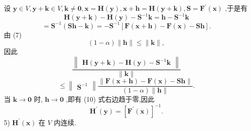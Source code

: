 设 \(\mathbf{y} \in  V,\mathbf{y} + \mathbf{k} \in  V,\mathbf{k} \neq  \mathbf{0},\mathbf{x} = \mathbf{H}\left( \mathbf{y}\right) ,\mathbf{x} + \mathbf{h} = \mathbf{H}\left( {\mathbf{y} + \mathbf{k}}\right) ,\mathbf{S} = {\mathbf{F}}^{\prime }\left( \mathbf{x}\right)\) ,于是有
\[
\mathbf{H}\left( {\mathbf{y} + \mathbf{k}}\right)  - \mathbf{H}\left( \mathbf{y}\right)  - {\mathbf{S}}^{-1}\mathbf{k} = \mathbf{h} - {\mathbf{S}}^{-1}\mathbf{k}
\]
\[
= {\mathbf{S}}^{-1}\left( {\mathbf{{Sh}} - \mathbf{k}}\right)  =  - {\mathbf{S}}^{-1}\left\lbrack  {\mathbf{F}\left( {\mathbf{x} + \mathbf{h}}\right)  - \mathbf{F}\left( \mathbf{x}\right)  - \mathbf{{Sh}}}\right\rbrack  .
\]
由 (7)
\[
\left( {1 - \alpha }\right) \parallel \mathbf{h}\parallel  \leq  \parallel \mathbf{k}\parallel ,
\]
因此
\[
\frac{\begin{Vmatrix}\mathbf{H}\left( \mathbf{y} + \mathbf{k}\right)  - \mathbf{H}\left( \mathbf{y}\right)  - {\mathbf{S}}^{-1}\mathbf{k}\end{Vmatrix}}{\parallel \mathbf{k}\parallel }
\]
\[
\leq  \begin{Vmatrix}{\mathbf{S}}^{-1}\end{Vmatrix}\frac{\parallel \mathbf{F}\left( {\mathbf{x} + \mathbf{h}}\right)  - \mathbf{F}\left( \mathbf{x}\right)  - \mathbf{{Sh}}\parallel }{\left( {1 - \alpha }\right) \parallel \mathbf{h}\parallel }. \tag{10}
\]
当 \(\mathbf{k} \rightarrow  \mathbf{0}\) 时, \(\mathbf{h} \rightarrow  \mathbf{0}\) ,即有 (10) 式右边趋于零,因此
\[
{\mathbf{H}}^{\prime }\left( \mathbf{y}\right)  = {\left\lbrack  {\mathbf{F}}^{\prime }\left( \mathbf{x}\right) \right\rbrack  }^{-1}.
\]
5) \({\mathbf{H}}^{\prime }\left( \mathbf{x}\right)\) 在 \(V\) 内连续.

